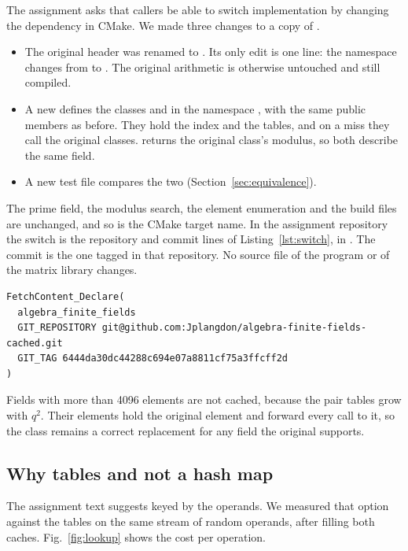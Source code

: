 The assignment asks that callers be able to switch implementation by changing the
dependency in CMake. We made three changes to a copy of .
\begin{itemize}
  \item The original header  was renamed to
        . Its only edit is one line: the namespace changes
        from  to . The original arithmetic is otherwise
        untouched and still compiled.
  \item A new  defines the classes  and
         in the namespace , with the same public
        members as before. They hold the index and the tables, and on a miss they call the
        original classes.  returns the original class's modulus, so both
        describe the same field.
  \item A new test file compares the two (Section~\ref{sec:equivalence}).
\end{itemize}
The prime field, the modulus search, the element enumeration and the build files are
unchanged, and so is the CMake target name. In the assignment repository the switch is the
repository and commit lines of Listing~\ref{lst:switch}, in .
The commit is the one tagged  in that repository. No source file of the
program or of the matrix library changes.

\begin{lstlisting}[language={},caption={The dependency entry that selects the
library.},label={lst:switch}]
FetchContent_Declare(
  algebra_finite_fields
  GIT_REPOSITORY git@github.com:Jplangdon/algebra-finite-fields-cached.git
  GIT_TAG 6444da30dc44288c694e07a8811cf75a3ffcff2d
)
\end{lstlisting}

Fields with more than 4096 elements are not cached, because the pair tables grow with
$q^2$. Their elements hold the original element and forward every call to it, so the class
remains a correct replacement for any field the original supports.

\subsection{Why tables and not a hash map}

The assignment text suggests  keyed by the operands. We measured
that option against the tables on the same stream of random operands, after filling both
caches. Fig.~\ref{fig:lookup} shows the cost per operation.

